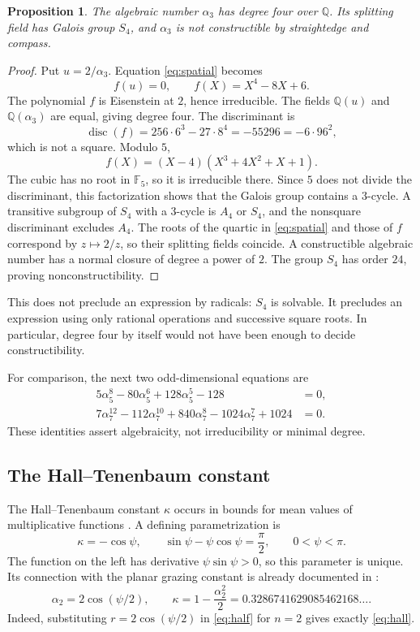 \documentclass[11pt,a4paper]{article}
\numberwithin{equation}{section}
\newtheorem{proposition}[theorem]{Proposition}
\theoremstyle{definition}
\theoremstyle{remark}
\begin{document}
\begin{proposition}\label{prop:s4}
The algebraic number $\alpha_3$ has degree four over $\mathbb Q$. Its splitting field has Galois group $S_4$, and $\alpha_3$ is not constructible by straightedge and compass.
\end{proposition}
\begin{proof}
Put $u=2/\alpha_3$. Equation \eqref{eq:spatial} becomes
\[
 f(u)=0,\qquad f(X)=X^4-8X+6.
\]
The polynomial $f$ is Eisenstein at $2$, hence irreducible. The fields $\mathbb Q(u)$ and $\mathbb Q(\alpha_3)$ are equal, giving degree four. The discriminant is
\[
 \operatorname{disc}(f)=256\cdot6^3-27\cdot8^4=-55296=-6\cdot96^2,
\]
which is not a square. Modulo $5$,
\[
 f(X)=(X-4)(X^3+4X^2+X+1).
\]
The cubic has no root in $\mathbb F_5$, so it is irreducible there. Since $5$ does not divide the discriminant, this factorization shows that the Galois group contains a $3$-cycle. A transitive subgroup of $S_4$ with a $3$-cycle is $A_4$ or $S_4$, and the nonsquare discriminant excludes $A_4$. The roots of the quartic in \eqref{eq:spatial} and those of $f$ correspond by $z\mapsto2/z$, so their splitting fields coincide. A constructible algebraic number has a normal closure of degree a power of $2$. The group $S_4$ has order $24$, proving nonconstructibility.
\end{proof}

This does not preclude an expression by radicals: $S_4$ is solvable. It precludes an expression using only rational operations and successive square roots. In particular, degree four by itself would not have been enough to decide constructibility.

For comparison, the next two odd-dimensional equations are
\begin{align}
 5\alpha_5^8-80\alpha_5^6+128\alpha_5^5-128&=0,\label{eq:n5}\\
 7\alpha_7^{12}-112\alpha_7^{10}+840\alpha_7^8-1024\alpha_7^7+1024&=0.
\end{align}
These identities assert algebraicity, not irreducibility or minimal degree.

\subsection{The Hall--Tenenbaum constant}

The Hall--Tenenbaum constant $\kappa$ occurs in bounds for mean values of multiplicative functions \cite{HallTenenbaum}. A defining parametrization is
\begin{equation}\label{eq:hall}
 \kappa=-\cos\psi,\qquad
 \sin\psi-\psi\cos\psi=\frac\pi2,\qquad 0<\psi<\pi.
\end{equation}
The function on the left has derivative $\psi\sin\psi>0$, so this parameter is unique. Its connection with the planar grazing constant is already documented in \cite{OEISPsi,Finch}:
\begin{equation}\label{eq:hall-goat}
 \alpha_2=2\cos(\psi/2),\qquad
 \kappa=1-\frac{\alpha_2^2}{2}
 =0.3286741629085462168\ldots.
\end{equation}
Indeed, substituting $r=2\cos(\psi/2)$ in \eqref{eq:half} for $n=2$ gives exactly \eqref{eq:hall}.
\end{document}
